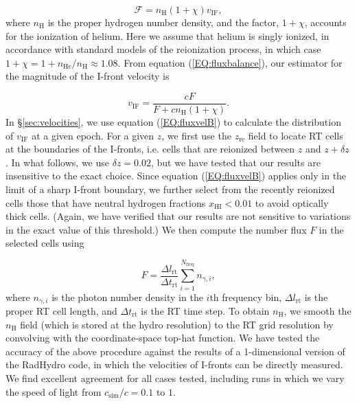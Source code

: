 \documentclass[twocolumn]{aastex62}
\newcommand{\zreion}{z_{\mathrm{re}}}
\newcommand{\vIF}{v_{\mathrm{IF}}}
\begin{document}
\begin{appendix}
\begin{equation}
\mathcal{F} = n_{\mathrm{H}} (1+\chi) \vIF,
\label{EQ:fluxbalance}
\end{equation}
where $n_{\mathrm{H}}$ is the proper hydrogen number density, and the factor, $1+\chi$, accounts for the ionization of helium.  Here we assume that helium is singly ionized, in accordance with standard models of the reionization process, in which case $1+\chi = 1+n_{\mathrm{He}}/n_{\mathrm{H}} \approx 1.08$.  From equation (\ref{EQ:fluxbalance}), our estimator for the magnitude of the I-front velocity is {\citep{2006ApJ...648..922S}}

\begin{equation}
\vIF = \frac{c F }{F+c  n_{\mathrm{H}}(1+\chi)}.
\label{EQ:fluxvelB}
\end{equation}  
In \S \ref{sec:velocities}, we use equation (\ref{EQ:fluxvelB}) to calculate the distribution of $\vIF$ at a given epoch.   For a given $z$, we first use the $\zreion$ field to locate RT cells at the boundaries of the I-fronts, i.e. cells that are reionized between $z$ and $z+\delta z$.  In what follows, we use $\delta z = 0.02$, but we have tested that our results are insensitive to the exact choice.  Since equation (\ref{EQ:fluxvelB}) applies only in the limit of a sharp I-front boundary, we further select from the recently reionized cells those that have neutral hydrogen fractions $x_{\mathrm{HI}} < 0.01$ to avoid optically thick cells.  (Again, we have verified that our results are not sensitive to variations in the exact value of this threshold.)  We then compute the number flux $F$ in the selected cells using 

\begin{equation}
F = \frac{\Delta l_{\mathrm{rt}}}{\Delta t_{\mathrm{rt}}} \sum_{i=1}^{N_{\mathrm{freq}}} n_{\gamma,i}, 
\end{equation} 
where $n_{\gamma,i}$ is the photon number density in the $i$th frequency bin, $\Delta l_{\mathrm{rt}}$ is the proper RT cell length, and $\Delta t_{\mathrm{rt}}$ is the RT time step.  To obtain $n_{\mathrm{H}}$, we smooth the $n_{\mathrm{H}}$ field (which is stored at the hydro resolution) to the RT grid resolution by convolving with the coordinate-space top-hat function.  We have tested the accuracy of the above procedure against the results of a 1-dimensional version of the RadHydro code, in which the velocities of I-fronts can be directly measured. We find excellent agreement for all cases tested, including runs in which we vary the speed of light from $c_{\mathrm{sim}}/c=0.1$ to $1$. 


\end{appendix}
\end{document}
